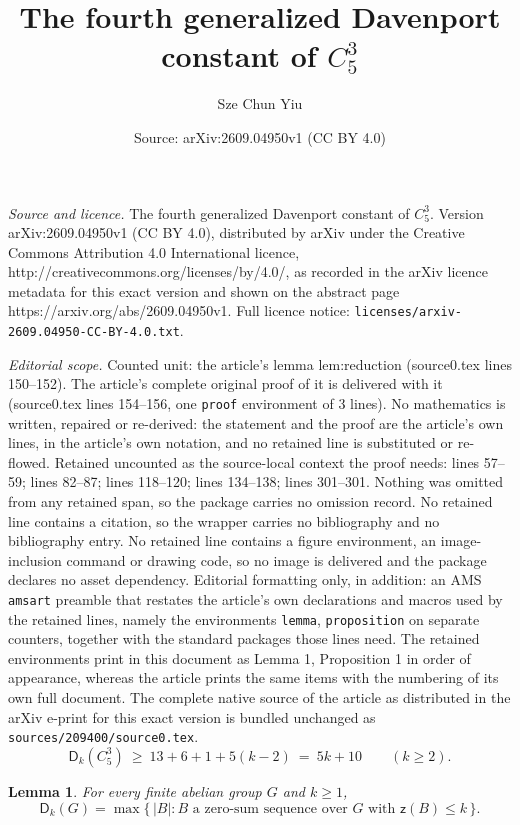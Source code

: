 \documentclass[10pt,a4paper]{amsart}
\title{The fourth generalized Davenport constant of $C_5^3$}
\author{Sze Chun Yiu}
\date{Source: arXiv:2609.04950v1 (CC BY 4.0)}
\newtheorem{lemma}{Lemma}
\newcommand{\C}{C_5^{3}}
\newcommand{\Dk}{\mathsf{D}}
\newcommand{\zz}{\mathsf{z}}
\begin{document}
\maketitle

\noindent\emph{Source and licence.} The fourth generalized Davenport constant of $C_5^3$. Version arXiv:2609.04950v1 (CC BY 4.0), distributed by arXiv under the Creative Commons Attribution 4.0 International licence, http://creativecommons.org/licenses/by/4.0/, as recorded in the arXiv licence metadata for this exact version and shown on the abstract page https://arxiv.org/abs/2609.04950v1. Full licence notice: \texttt{licenses/arxiv-2609.04950-CC-BY-4.0.txt}.\par\smallskip

\noindent\textit{Editorial scope.} Counted unit: the article's lemma lem:reduction (source0.tex lines 150--152). The article's complete original proof of it is delivered with it (source0.tex lines 154--156, one \texttt{proof} environment of 3 lines). No mathematics is written, repaired or re-derived: the statement and the proof are the article's own lines, in the article's own notation, and no retained line is substituted or re-flowed.  Retained uncounted as the source-local context the proof needs: lines 57--59; lines 82--87; lines 118--120; lines 134--138; lines 301--301.  Nothing was omitted from any retained span, so the package carries no omission record.  No retained line contains a citation, so the wrapper carries no bibliography and no bibliography entry.  No retained line contains a figure environment, an image-inclusion command or drawing code, so no image is delivered and the package declares no asset dependency.  Editorial formatting only, in addition: an AMS \texttt{amsart} preamble that restates the article's own declarations and macros used by the retained lines, namely the environments \texttt{lemma}, \texttt{proposition} on separate counters, together with the standard packages those lines need.  The retained environments print in this document as Lemma 1, Proposition 1 in order of appearance, whereas the article prints the same items with the numbering of its own full document.  The complete native source of the article as distributed in the arXiv e-print for this exact version is bundled unchanged as \texttt{sources/209400/source0.tex}.
\begin{equation}\label{eq:lower}
\Dk_k(\C)\ \ge\ 13+6+1+5(k-2)\ =\ 5k+10\qquad(k\ge2).
\end{equation}

\begin{lemma}\label{lem:Dk-char}
For every finite abelian group $G$ and $k\ge1$,
\[
\Dk_k(G)=\max\{\,|B| : B \text{ a zero-sum sequence over } G \text{ with } \zz(B)\le k\,\}.
\]
\end{lemma}
\end{document}
